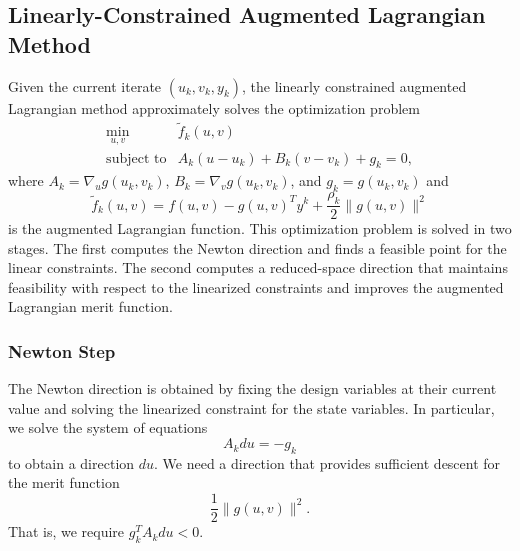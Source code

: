 \subsection{Linearly-Constrained Augmented Lagrangian Method}
Given the current iterate $(u_k, v_k, y_k)$, the linearly constrained
augmented Lagrangian method approximately solves the optimization 
problem
\[
\begin{array}{ll}
\displaystyle \min_{u,v} & \tilde{f}_k(u, v) \\
\mbox{subject to} & A_k (u-u_k) + B_k (v-v_k) + g_k = 0,
\end{array}
\]
where $A_k = \nabla_u g(u_k,v_k)$, $B_k = \nabla_v g(u_k,v_k)$, and
$g_k = g(u_k, v_k)$ and 
\[
\tilde{f}_k(u,v) = f(u,v) - g(u,v)^T y^k + \frac{\rho_k}{2} \| g(u,v) \|^2
\]
is the augmented Lagrangian function.  This optimization problem is
solved in two stages.  The first computes the Newton direction and
finds a feasible point for the linear constraints.  The second 
computes a reduced-space direction that maintains feasibility
with respect to the linearized constraints and improves the
augmented Lagrangian merit function.

\subsubsection{Newton Step}

The Newton direction is obtained by fixing the design variables at
their current value and solving the linearized constraint for the
state variables.  In particular, we solve the system of equations
\[
A_k du = -g_k
\]
to obtain a direction $du$.  We need a direction that provides
sufficient descent for the merit function
\[
  \frac{1}{2} \|g(u,v)\|^2.
\]
That is, we require $g_k^T A_k du < 0$.  

